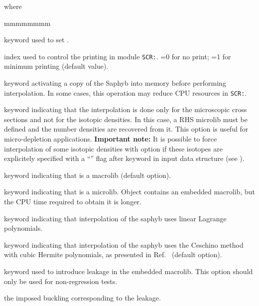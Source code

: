 \noindent where
\begin{ListeDeDescription}{mmmmmmmm}

\item[\moc{EDIT}] keyword used to set .

\item[\dusa{iprint}] index used to control the printing in module {\tt SCR:}. =0 for no print; =1 for minimum printing (default value).

\item[\moc{MEMORY}] keyword activating a copy of the Saphyb into memory before performing interpolation. In some cases, this
operation may reduce CPU resources in {\tt SCR:}.
 
\item[\moc{RES}] keyword indicating that the interpolation is done only for the microscopic cross sections and not for the isotopic densities. In this case, a RHS {\sc microlib} must be defined and the number densities are recovered from it. This option is useful for micro-depletion applications. {\bf Important note:} It is possible to force interpolation of some isotopic densities with  option if these
isotopes are explicitely specified with a ``\moc{*}'' flag after  keyword in  input data structure (see ).

\item[\moc{MACRO}] keyword indicating that  is a {\sc macrolib} (default option).

\item[\moc{MICRO}] keyword indicating that  is a {\sc microlib}. Object  contains an embedded {\sc macrolib}, but the CPU time required to obtain it is longer.

\item[\moc{LINEAR}] keyword indicating that interpolation of the {\sc saphyb} uses linear Lagrange
polynomials.

\item[\moc{CUBIC}] keyword indicating that interpolation of the {\sc saphyb} uses the Ceschino method
with cubic Hermite polynomials, as presented in Ref.~ (default option).

\item[\moc{LEAK}] keyword used to introduce leakage in the embedded {\sc macrolib}. This option should only be used for non-regression tests.

\item[\dusa{b2}] the imposed buckling corresponding to the leakage.


\end{ListeDeDescription}
